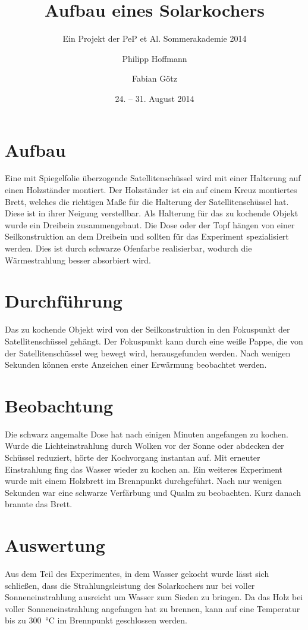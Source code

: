 

\title{Aufbau eines Solarkochers}
\subtitle{Ein Projekt der PeP et Al. Sommerakademie 2014}
\date{24. -- 31. August 2014}

\author{Philipp Hoffmann \and Fabian Götz}


\maketitle
\tableofcontents


\section{Aufbau}

Eine mit Spiegelfolie überzogende Satellitenschüssel wird mit einer Halterung auf einen Holzständer montiert.
Der Holzständer ist ein auf einem Kreuz montiertes Brett, welches die richtigen Maße für die Halterung der Satellitenschüssel hat.
Diese ist in ihrer Neigung verstellbar.
Als Halterung für das zu kochende Objekt wurde ein Dreibein zusammengebaut.
Die Dose oder der Topf hängen von einer Seilkonstruktion an dem Dreibein und sollten für das Experiment spezialisiert werden.
Dies ist durch schwarze Ofenfarbe realisierbar, wodurch die Wärmestrahlung besser absorbiert wird. 


\section{Durchführung}

Das zu kochende Objekt wird von der Seilkonstruktion in den Fokuspunkt der Satellitenschüssel gehängt. Der Fokuspunkt kann durch eine weiße Pappe, die von der Satellitenschüssel weg bewegt wird, herausgefunden werden. Nach wenigen Sekunden können erste Anzeichen einer Erwärmung beobachtet werden.


\section{Beobachtung}

Die schwarz angemalte Dose hat nach einigen Minuten angefangen zu kochen. Wurde die Lichteinstrahlung durch Wolken vor der Sonne oder abdecken der Schüssel reduziert, hörte der Kochvorgang instantan auf. Mit erneuter Einstrahlung fing das Wasser wieder zu kochen an. 
Ein weiteres Experiment wurde mit einem Holzbrett im Brennpunkt durchgeführt. Nach nur wenigen Sekunden war eine schwarze Verfärbung und Qualm zu beobachten. Kurz danach brannte das Brett.



\section{Auswertung}

Aus dem Teil des Experimentes, in dem Wasser gekocht wurde lässt sich schließen, dass die Strahlungsleistung des Solarkochers nur bei voller Sonneneinstrahlung ausreicht um Wasser zum Sieden zu bringen.
Da das Holz bei voller Sonneneinstrahlung angefangen hat zu brennen, kann auf eine Temperatur bis zu \SI{300}{\celsius} im Brennpunkt geschlossen werden.

